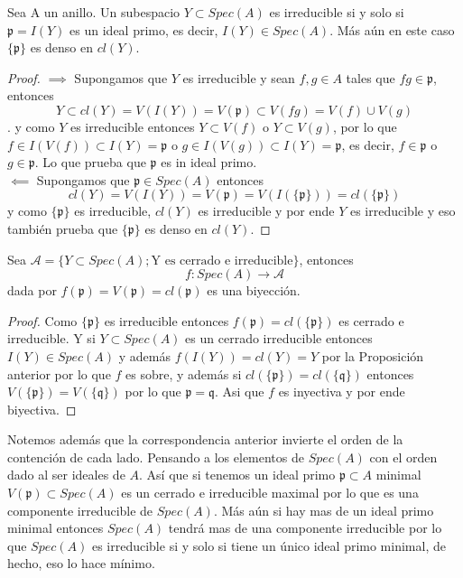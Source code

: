 \documentclass{article}
\begin{document}
\begin{proposicion}{}{}
    Sea A un anillo. Un subespacio $Y \subset Spec(A)$
    es irreducible si y solo si $\mathfrak{p} = I(Y)$
    es un ideal primo, es decir, $I(Y) \in Spec(A)$.
    Más aún en este caso $\{\mathfrak{p}\}$ es denso en 
    $cl(Y)$.
\end{proposicion}
\begin{proof}
    $\implies$ Supongamos que $Y$ es irreducible y sean 
    $f,g \in A$ tales que $fg \in \mathfrak{p}$, entonces
    $$Y \subset cl(Y) = V(I(Y)) = V(\mathfrak{p}) \subset V(fg) = V(f) \cup V(g)$$.
    y como $Y$ es irreducible entonces $Y \subset V(f)$ o $Y \subset V(g)$,
    por lo que $f \in I(V(f)) \subset I(Y) = \mathfrak{p}$
    o $g \in I(V(g)) \subset I(Y) = \mathfrak{p}$, es decir,
    $f \in \mathfrak{p}$ o $g \in \mathfrak{p}$. Lo que prueba
    que $\mathfrak{p}$ es in ideal primo.\\
    $\impliedby$ Supongamos que $\mathfrak{p} \in Spec(A)$
    entonces 
    $$cl(Y) = V(I(Y)) = V(\mathfrak{p}) = V(I(\{\mathfrak{p}\})) = cl(\{\mathfrak{p}\})$$
    y como $\{\mathfrak{p}\}$ es irreducible, $cl(Y)$ es irreducible y por ende
    $Y$ es irreducible y eso también prueba que $\{\mathfrak{p}\}$
    es denso en $cl(Y)$.
\end{proof}

\begin{corolario}{}{}
    Sea $\mathcal{A} = \{Y\subset Spec(A); \mbox{Y es cerrado e irreducible}\}$,
    entonces 
    $$f:Spec(A) \rightarrow \mathcal{A}$$ 
    dada por $f(\mathfrak{p}) = V(\mathfrak{p}) = cl(\mathfrak{p})$ es una biyección.
\end{corolario}
\begin{proof}
    Como $\{\mathfrak{p}\}$ es irreducible entonces
    $f(\mathfrak{p}) = cl(\{\mathfrak{p}\})$ es cerrado e irreducible.
    Y si $Y \subset Spec(A)$ es un cerrado irreducible entonces
    $I(Y) \in Spec(A)$ y además $f(I(Y)) = cl(Y) = Y$ por la Proposición anterior
    por lo que $f$ es sobre, y además si $cl(\{\mathfrak{p}\}) = cl(\{\mathfrak{q}\})$
    entonces $V(\{\mathfrak{p}\}) = V(\{\mathfrak{q}\})$ por lo que $\mathfrak{p} = \mathfrak{q}$.
    Asi que $f$ es inyectiva y por ende biyectiva.
\end{proof}

Notemos además que la correspondencia anterior
invierte el orden de la contención de cada lado.
Pensando a los elementos de $Spec(A)$ con el orden 
dado al ser ideales de $A$. Así que si tenemos un
ideal primo $\mathfrak{p} \subset A$ minimal 
$V(\mathfrak{p}) \subset Spec(A)$ es  un cerrado e 
irreducible maximal por lo que es una componente irreducible 
de $Spec(A)$. Más aún si hay mas de un ideal primo minimal
entonces $Spec(A)$ tendrá mas de una componente irreducible
por lo que $Spec(A)$ es irreducible si y solo si tiene un único
ideal primo minimal, de hecho, eso lo hace mínimo.
\end{document}
